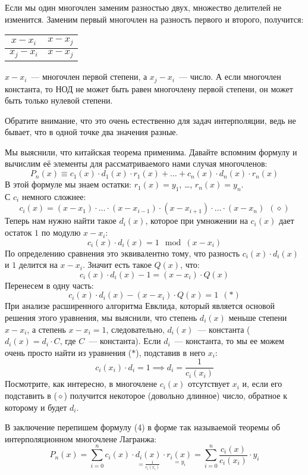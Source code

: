 \documentclass[russian]{lecture-notes}
\theoremstyle{definition}
\begin{document}
	Если мы один многочлен заменим разностью двух, множество делителей не изменится. Заменим первый многочлен на разность первого и второго, получится:
	\begin{table}[H]
		\centering
		\begin{tabular}{c|c}
			$x - x_i$ & $x - x_j$ \\ \hline
			$x_j - x_i$ & $x - x_j$
		\end{tabular}
	\end{table}

	$x - x_i$~--- многочлен первой степени, а $x_j - x_i$~--- число. А если многочлен константа, то НОД не может быть равен многочлену первой степени, он может быть только нулевой степени. 
	
	Обратите внимание, что это очень естественно для задач интерполяции, ведь не бывает, что в одной точке два значения разные.
	
	Мы выяснили, что китайская теорема применима. Давайте вспомним формулу и вычислим её элементы для рассматриваемого нами случая многочленов:
	\begin{equation}
		P_n(x) \equiv c_1(x) \cdot d_1(x) \cdot r_1(x) + \ldots + c_n(x) \cdot d_n(x) \cdot r_n(x)
	\end{equation}
	В этой формуле мы знаем остатки: $r_1(x) = y_1$, \ldots , $r_n(x) = y_n$. 
\\
 С $c_i$ немного сложнее:
	\[
		c_i(x) = (x - x_1) \cdot \ldots \cdot (x - x_{i-1}) \cdot (x - x_{i+1}) \cdot \ldots \cdot (x - x_n) \ \ (\diamond)
	\]
	Теперь нам нужно найти такое $d_i(x)$, которое при умножении на $c_i(x)$ дает остаток $1$ по модулю $x - x_i$:
	\[
		c_i(x) \cdot d_i(x) = 1 \mod{(x - x_i)}
	\]
	По определению сравнения это эквивалентно тому, что разность $c_i(x) \cdot d_i(x)$ и $1$ делится на $x - x_i$. Значит есть такое $Q(x)$, что:
	\[
		c_i(x) \cdot d_i(x) - 1 = (x - x_i) \cdot Q(x)
	\]
	Перенесем в одну часть:
	\[
		c_i(x) \cdot d_i(x) - (x - x_i) \cdot Q(x) = 1 \ \ (\ast) 
	\]
	При анализе расширенного алгоритма Евклида, который является основой решения этого уравнения, мы выяснили, что степень $d_i(x)$ меньше степени $x - x_i$, а степень $x - x_i = 1$, следовательно, $d_i(x)$~--- константа ($d_i(x) = d_i \cdot C$, где $C$~--- константа). Если $d_i$~--- константа, то мы ее можем очень просто найти из уравнения ($\ast$), подставив в него $x_i$:
	\[
		c_i(x_i) \cdot d_i = 1 \implies d_i = \frac{1}{c_i(x_i)}
	\]
	Посмотрите, как интересно, в многочлене $c_i(x)$ отсутствует $x_i$ и, если его подставить в ($\diamond$) получится некоторое (довольно длинное) число, обратное к которому и будет $d_i$.
	
	В заключение перепишем формулу (4) в форме так называемой теоремы об интерполяционном многочлене Лагранжа:
	\[
		P_n(x) = \sum_{i=0}^{n} c_i(x) \cdot \underset{= \frac{1}{c_i(x_i)}}{d_i(x)} \cdot \underset{= y_i}{r_i(x)} = \sum_{i=0}^{n} \frac{c_i(x)}{c_i(x_i)} \cdot y_i
	\]
	
\end{document}
